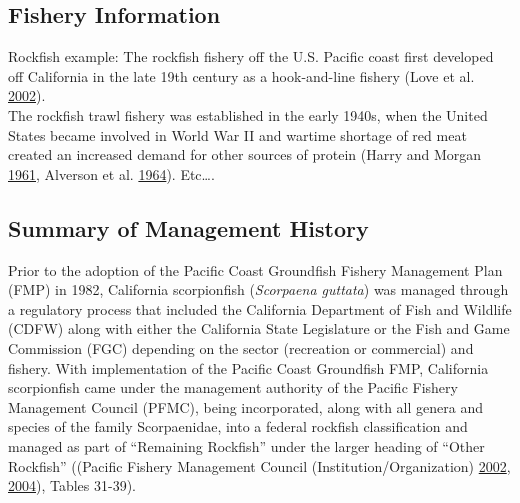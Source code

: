 \documentclass[12pt,]{article}
\begin{document}
\subsection{Fishery Information}\label{fishery-information}

Rockfish example: The rockfish fishery off the U.S. Pacific coast first
developed off California in the late 19th century as a hook-and-line
fishery (Love et al. \protect\hyperlink{ref-Love2002}{2002}).\\
The rockfish trawl fishery was established in the early 1940s, when the
United States became involved in World War II and wartime shortage of
red meat created an increased demand for other sources of protein (Harry
and Morgan \protect\hyperlink{ref-Harry1961}{1961}, Alverson et al.
\protect\hyperlink{ref-Alverson1964}{1964}). Etc\ldots{}.

\subsection{Summary of Management
History}\label{summary-of-management-history}

Prior to the adoption of the Pacific Coast Groundfish Fishery Management
Plan (FMP) in 1982, California scorpionfish (\emph{Scorpaena guttata})
was managed through a regulatory process that included the California
Department of Fish and Wildlife (CDFW) along with either the California
State Legislature or the Fish and Game Commission (FGC) depending on the
sector (recreation or commercial) and fishery. With implementation of
the Pacific Coast Groundfish FMP, California scorpionfish came under the
management authority of the Pacific Fishery Management Council (PFMC),
being incorporated, along with all genera and species of the family
Scorpaenidae, into a federal rockfish classification and managed as part
of ``Remaining Rockfish'' under the larger heading of ``Other Rockfish''
((Pacific Fishery Management Council (Institution/Organization)
\protect\hyperlink{ref-PFMC2002}{2002},
\protect\hyperlink{ref-PFMC2004}{2004}), Tables 31-39).
\end{document}
